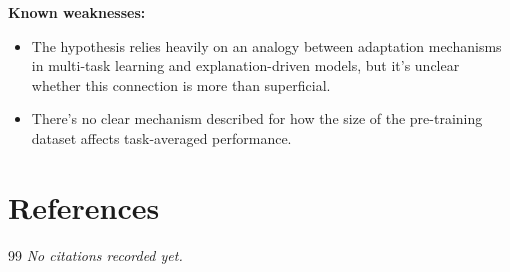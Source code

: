 \documentclass[12pt,a4paper]{article}
\begin{document}
\textbf{Known weaknesses:}
\begin{itemize}
  \item The hypothesis relies heavily on an analogy between adaptation mechanisms in multi-task learning and explanation-driven models, but it's unclear whether this connection is more than superficial.
  \item There's no clear mechanism described for how the size of the pre-training dataset affects task-averaged performance.
\end{itemize}


\section{References}

\begin{thebibliography}{99}
\textit{No citations recorded yet.}
\end{thebibliography}
\end{document}
